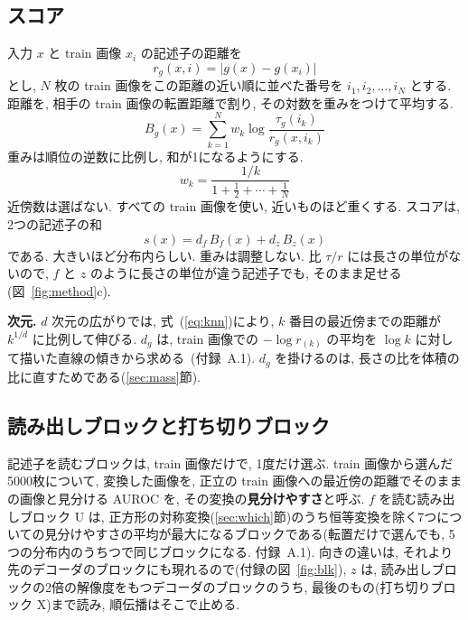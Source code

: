 \documentclass[MIRU,submit]{miru2025j}
\renewcommand{\eqref}[1]{(\ref{#1})}
\begin{document}
\subsection{スコア}
\label{sec:score}
入力 $x$ と train 画像 $x_i$ の記述子の距離を
\begin{equation}
r_g(x,i)=\bigl|g(x)-g(x_i)\bigr|
\label{eq:r}
\end{equation}
とし, $N$ 枚の train 画像をこの距離の近い順に並べた番号を $i_1,i_2,\ldots,i_N$ とする. 距離を, 相手の train 画像の転置距離で割り, その対数を重みをつけて平均する.
\begin{equation}
B_g(x)=\sum_{k=1}^{N}w_k\log\frac{\tau_g(i_k)}{r_g(x,i_k)}
\label{eq:B}
\end{equation}
重みは順位の逆数に比例し, 和が1になるようにする.
\begin{equation}
w_k=\frac{1/k}{1+\frac{1}{2}+\cdots+\frac{1}{N}}
\label{eq:w}
\end{equation}
近傍数は選ばない. すべての train 画像を使い, 近いものほど重くする. スコアは, 2つの記述子の和
\begin{equation}
s(x)=d_f\,B_f(x)+d_z\,B_z(x)
\label{eq:score}
\end{equation}
である. 大きいほど分布内らしい. 重みは調整しない. 比 $\tau/r$ には長さの単位がないので, $f$ と $z$ のように長さの単位が違う記述子でも, そのまま足せる(図~\ref{fig:method}c).

\textbf{次元.} $d$ 次元の広がりでは, 式~\eqref{eq:knn}により, $k$ 番目の最近傍までの距離が $k^{1/d}$ に比例して伸びる. $d_g$ は, train 画像での $-\log r_{(k)}$ の平均を $\log k$ に対して描いた直線の傾きから求める~\cite{levina2004mle}(付録~A.1). $d_g$ を掛けるのは, 長さの比を体積の比に直すためである(\ref{sec:mass}節).

\subsection{読み出しブロックと打ち切りブロック}
\label{sec:blocks}
記述子を読むブロックは, train 画像だけで, 1度だけ選ぶ. train 画像から選んだ5000枚について, 変換した画像を, 正立の train 画像への最近傍の距離でそのままの画像と見分ける AUROC を, その変換の\textbf{見分けやすさ}と呼ぶ. $f$ を読む読み出しブロック U は, 正方形の対称変換(\ref{sec:which}節)のうち恒等変換を除く7つについての見分けやすさの平均が最大になるブロックである(転置だけで選んでも, 5つの分布内のうち\nNSameU{}つで同じブロックになる. 付録~A.1). 向きの違いは, それより先のデコーダのブロックにも現れるので(付録の図~\ref{fig:blk}), $z$ は, 読み出しブロックの2倍の解像度をもつデコーダのブロックのうち, 最後のもの(打ち切りブロック X)まで読み, 順伝播はそこで止める.
\end{document}
